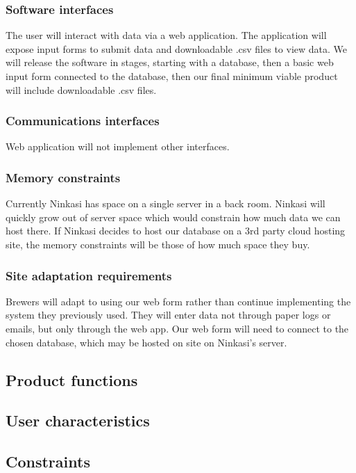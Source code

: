\documentclass[draftclsnofoot,onecolumn,letterpaper,10pt,compsoc]{IEEEtran}
\begin{document}
		\subsubsection{Software interfaces}
        The user will interact with data via a web application. The application will expose input forms to submit data and downloadable .csv files to view data. We will release the software in stages, starting with a database, then a basic web input form connected to the database, then our final minimum viable product will include downloadable .csv files. 
        
		\subsubsection{Communications interfaces}
        Web application will not implement other interfaces.
        
		\subsubsection{Memory constraints}
        Currently Ninkasi has space on a single server in a back room. Ninkasi will quickly grow out of server space which would constrain how much data we can host there. If Ninkasi decides to host our database on a 3rd party cloud hosting site, the memory constraints will be those of how much space they buy.
        
		\subsubsection{Site adaptation requirements}
        Brewers will adapt to using our web form rather than continue implementing the system they previously used. They will enter data not through paper logs or emails, but only through the web app. Our web form will need to connect to the chosen database, which may be hosted on site on Ninkasi’s server.
        
	\subsection{Product functions}
	\subsection{User characteristics}
	\subsection{Constraints}
\end{document}
